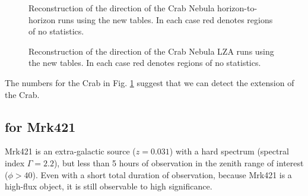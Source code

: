 \documentclass[main.tex]{subfiles}
\begin{document}
\begin{figure}[H]
  \begin{center}
  \end{center}
  \caption[Crab (horizon-to-horizon runs) direction reconstruction using Method5t.]{Reconstruction of the direction of the Crab Nebula horizon-to-horizon runs using the new \disp tables. In each case red denotes regions of no statistics.}
  \label{fig:crab_disp}
\end{figure}

\begin{figure}[H]
  \begin{center}
  \end{center}
  \caption[Crab (LZA runs) direction reconstruction using Method5t.]{Reconstruction of the direction of the Crab Nebula LZA runs using the new \disp tables. In each case red denotes regions of no statistics.}
  \label{fig:crab_all_disp}
\end{figure}

The numbers for the Crab in Fig. \ref{fig:crab_disp} suggest that we can detect the extension of the Crab.

\subsection{\rse for Mrk421}
Mrk421 is an extra-galactic source ($z=0.031$) with a hard spectrum (spectral index $\Gamma=2.2$), but less than 5 hours of observation in the zenith range of interest ($\phi>40$). Even with a short total duration of observation, because Mrk421 is a high-flux object, it is still observable to high significance.
\end{document}
